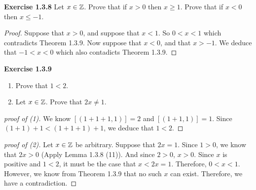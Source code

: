 \noindent \textbf{Exercise 1.3.8} Let \(x \in \mathbb{Z}\). Prove that if \(x > 0\) then \(x \geq 1\).
Prove that if \(x < 0\) then \(x \leq -1\).
\begin{proof}
    Suppose that \(x > 0\), and suppose that \(x < 1\). So \(0 < x < 1\) which contradicts Theorem 1.3.9. Now suppose that \(x < 0\), and that \(x > -1\).
    We deduce that \(-1 < x < 0\) which also contadicts Theorem 1.3.9.
\end{proof}



\noindent \textbf{Exercise 1.3.9}
\begin{enumerate}
    \item Prove that \(1 < 2\).
    \item Let \(x \in \mathbb{Z}\). Prove that \(2x \neq 1\).
\end{enumerate}
\begin{proof}[proof of (1)]
    We know \([(1+1+1, 1)] = 2\) and \([(1+1, 1)] = 1\). Since \((1+1) + 1 < (1+1+1) + 1\), we deduce that \(1 < 2\).
\end{proof}
\begin{proof}[proof of (2)]
    Let \(x \in \mathbb{Z}\) be arbitrary. Suppose that \(2x = 1\). Since \(1 > 0\), we know that \(2x > 0\) (Apply Lemma 1.3.8 (11)). And since \(2 > 0\), \(x > 0\).
    Since \(x\) is positive and \(1 < 2\), it must be the case that \(x < 2x = 1\). Therefore, \(0 < x < 1\). However, we know from Theorem 1.3.9 that no such \(x\) can exist. Therefore, we have a contradiction.
\end{proof}



